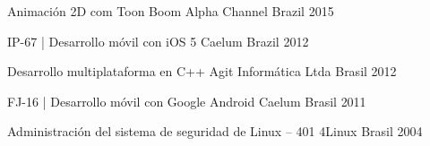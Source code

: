 

\begin{cventries}


  \cventry
    {Animación 2D com Toon Boom} %
    {Alpha Channel} %
    {Brazil} %
    {2015} %
    {}

  \cventry
    {IP-67 | Desarrollo móvil con iOS 5} %
    {Caelum} %
    {Brazil} %
    {2012} %
    {}


  \cventry
    {Desarrollo multiplataforma en C++} %
    {Agit Informática Ltda} %
    {Brasil} %
    {2012} %
    {}

  \cventry
    {FJ-16 | Desarrollo móvil con Google Android} %
    {Caelum} %
    {Brasil} %
    {2011} %
    {
    }

  \cventry
    {Administración del sistema de seguridad de Linux – 401} %
    {4Linux} %
    {Brasil} %
    {2004} %
    {}


\end{cventries}
